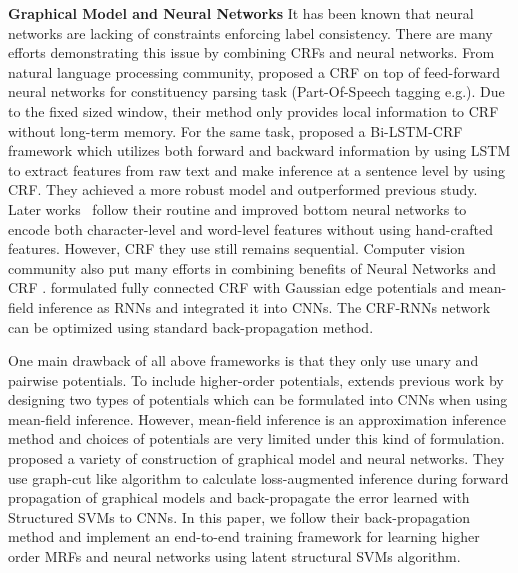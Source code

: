 \documentclass[sigconf,anonymous,review]{acmart}
\renewcommand{\citename}{\citet}
\renewcommand{\cite}{\citep}
\begin{document}
\textbf{Graphical Model and Neural Networks} It has been known
that neural networks are lacking of constraints enforcing label
consistency. There are many efforts demonstrating this issue by
combining CRFs and neural networks. From natural language
processing community, \citename{collobert2011natural} proposed a
CRF on top of feed-forward neural networks for constituency
parsing task (Part-Of-Speech tagging e.g.). Due to the fixed
sized window, their method only provides local information to CRF
without long-term memory. For the same task,
\citename{huang2015bidirectional} proposed a Bi-LSTM-CRF
framework which utilizes both forward and backward information by
using LSTM to extract features from raw text and make inference
at a sentence level by using CRF. They achieved a more robust
model and outperformed previous study. Later
works~\cite{ma2016end,lample2016neural} follow their routine and
improved bottom neural networks to encode both character-level
and word-level features without using hand-crafted features.
However, CRF they use still remains sequential. Computer vision
community also put many efforts in combining benefits of Neural
Networks and CRF \cite{chen2018deeplab,zheng2015conditional}.
\citename{zheng2015conditional} formulated fully connected CRF
with Gaussian edge potentials and mean-field inference as RNNs
and integrated it into CNNs. The CRF-RNNs network can be
optimized using standard back-propagation method.

One main drawback of all above frameworks is that they only use
unary and pairwise potentials. To include higher-order
potentials, \citename{arnab2016higher} extends previous work by
designing two types of potentials which can be formulated into
CNNs when using mean-field inference. However, mean-field
inference is an approximation inference method and choices of
potentials are very limited under this kind of formulation.
\citename{witoonchart2017application} proposed a variety of
construction of graphical model and neural networks. They use
graph-cut like algorithm to calculate loss-augmented inference
during forward propagation of graphical models and back-propagate
the error learned with Structured SVMs \cite{Joachims:ML09} to
CNNs. In this paper, we follow their back-propagation method and
implement an end-to-end training framework for learning higher
order MRFs and neural networks using latent structural SVMs
\cite{yu2009learning} algorithm.
\end{document}
